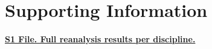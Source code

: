 \section*{Supporting Information}

\href{https://github.com/chartgerink/2015head/raw/master/submission/round\%201\%20review/S1\%20Reanalysis\%20results\%20per\%20discipline.xlsx}{\textbf{S1 File. Full reanalysis results per discipline.}}


  
  